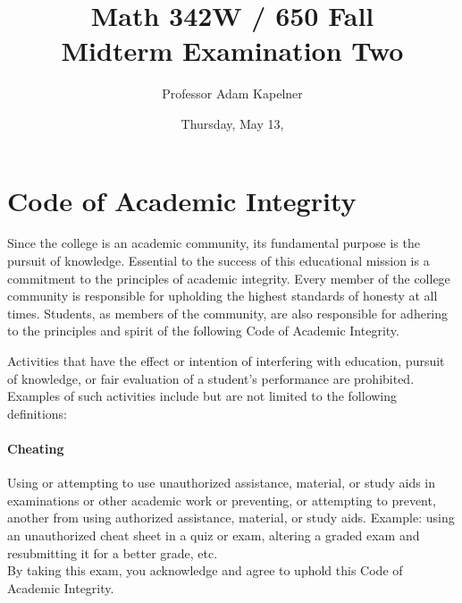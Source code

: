 \documentclass[12pt,landscape]{article}
\title{Math 342W / 650 Fall \the\year{} \\ Midterm Examination Two}
\author{Professor Adam Kapelner}
\date{Thursday, May 13, \the\year{}}
\begin{document}
\maketitle


\thispagestyle{empty}

\section*{Code of Academic Integrity}

\footnotesize
Since the college is an academic community, its fundamental purpose is the pursuit of knowledge. Essential to the success of this educational mission is a commitment to the principles of academic integrity. Every member of the college community is responsible for upholding the highest standards of honesty at all times. Students, as members of the community, are also responsible for adhering to the principles and spirit of the following Code of Academic Integrity.

Activities that have the effect or intention of interfering with education, pursuit of knowledge, or fair evaluation of a student's performance are prohibited. Examples of such activities include but are not limited to the following definitions:

\paragraph{Cheating} Using or attempting to use unauthorized assistance, material, or study aids in examinations or other academic work or preventing, or attempting to prevent, another from using authorized assistance, material, or study aids. Example: using an unauthorized cheat sheet in a quiz or exam, altering a graded exam and resubmitting it for a better grade, etc.
\\

\noindent By taking this exam, you acknowledge and agree to uphold this Code of Academic Integrity. \\


\normalsize
\end{document}
